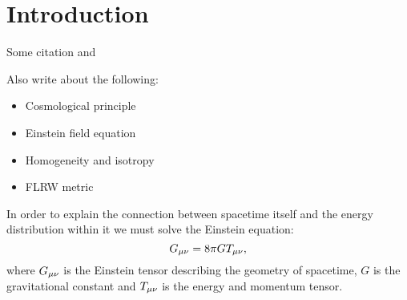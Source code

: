 \section{Introduction}\label{sec:introduction}

Some citation \cite{dodelson2020modern} and \cite{weinberg2008cosmology}

Also write about the following:

\begin{itemize}
    \item Cosmological principle
    \item Einstein field equation
    \item Homogeneity and isotropy
    \item FLRW metric 
\end{itemize}

In order to explain the connection between spacetime itself and the energy distribution within it we must solve the Einstein equation:
\begin{equation}\label{eq:introduction:einstein_equation}
    G_{\mu\nu} = 8\pi GT_{\mu\nu},
\end{equation}
where $G_{\mu\nu}$ is the Einstein tensor describing the geometry of spacetime, $G$ is the gravitational constant and $T_{\mu\nu}$ is the energy and momentum tensor.
